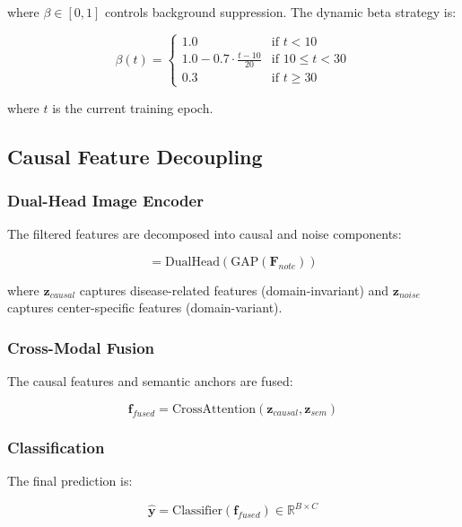 \documentclass[11pt]{article}
\begin{document}
where $\beta \in [0, 1]$ controls background suppression. The dynamic beta strategy is:

\begin{equation}
\beta(t) = \begin{cases}
1.0 & \text{if } t < 10 \\
1.0 - 0.7 \cdot \frac{t-10}{20} & \text{if } 10 \leq t < 30 \\
0.3 & \text{if } t \geq 30
\end{cases}
\end{equation}

where $t$ is the current training epoch.

\subsection{Causal Feature Decoupling}

\subsubsection{Dual-Head Image Encoder}

The filtered features are decomposed into causal and noise components:

\begin{equation}
[\mathbf{z}_{causal}, \mathbf{z}_{noise}] = \text{DualHead}(\text{GAP}(\mathbf{F}_{note}))
\end{equation}

where $\mathbf{z}_{causal}$ captures disease-related features (domain-invariant) and $\mathbf{z}_{noise}$ captures center-specific features (domain-variant).

\subsubsection{Cross-Modal Fusion}

The causal features and semantic anchors are fused:

\begin{equation}
\mathbf{f}_{fused} = \text{CrossAttention}(\mathbf{z}_{causal}, \mathbf{z}_{sem})
\end{equation}

\subsubsection{Classification}

The final prediction is:

\begin{equation}
\hat{\mathbf{y}} = \text{Classifier}(\mathbf{f}_{fused}) \in \mathbb{R}^{B \times C}
\end{equation}
\end{document}
